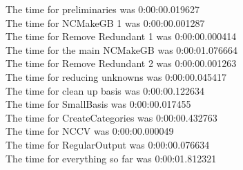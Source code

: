 \documentclass[rep10,leqno]{report}
\begin{document}
\noindent
The time for preliminaries was 0:00:00.019627\\
The time for NCMakeGB 1 was 0:00:00.001287\\
The time for Remove Redundant 1 was 0:00:00.000414\\
The time for the main NCMakeGB was 0:00:01.076664\\
The time for Remove Redundant 2 was 0:00:00.001263\\
The time for reducing unknowns was 0:00:00.045417\\
The time for clean up basis was 0:00:00.122634\\
The time for SmallBasis was 0:00:00.017455\\
The time for CreateCategories was 0:00:00.432763\\
The time for NCCV was 0:00:00.000049\\
The time for RegularOutput was 0:00:00.076634\\
The time for everything so far was 0:00:01.812321\\
\end{document}
